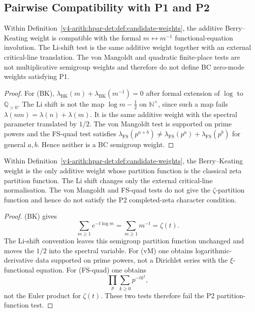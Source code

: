 \subsection{Pairwise Compatibility with P1 and P2}
\label{v4-arith:hpar-det:compat-P1-P2}

\begin{lemma}
\label{v4-arith:hpar-det:lem:P1-compat}
Within
Definition~\ref{v4-arith:hpar-det:def:candidate-weights}, the additive
Berry--Keating weight is compatible with the formal
\(m\leftrightarrow m^{-1}\) functional-equation involution. The
Li-shift test is the same additive weight together with an external
critical-line translation. The von Mangoldt and quadratic finite-place
tests are not multiplicative semigroup weights and therefore do
not define BC zero-mode weights satisfying P1.
\end{lemma}

\begin{proof}
For (BK),
\(\lambda_{\mathrm{BK}}(m)+\lambda_{\mathrm{BK}}(m^{-1})=0\) after
formal extension of \(\log\) to \(\mathbb{Q}_{>0}\). The Li shift is not the map
\(\log m-\frac12\) on \(\mathbb{N}^{\times}\), since such a map fails
\(\lambda(nm)=\lambda(n)+\lambda(m)\). It is the same additive weight
with the spectral parameter translated by \(1/2\). The von Mangoldt
test is supported on prime powers and the FS-quad test satisfies
\(\lambda_{\mathrm{FS}}(p^{a+b})\ne
\lambda_{\mathrm{FS}}(p^{a})+\lambda_{\mathrm{FS}}(p^{b})\) for
general \(a,b\). Hence neither is a BC semigroup weight.
\end{proof}

\begin{lemma}
\label{v4-arith:hpar-det:lem:P2-compat}
Within
Definition~\ref{v4-arith:hpar-det:def:candidate-weights}, the Berry--Keating
weight is the only additive weight whose partition function is the
classical zeta partition function. The Li shift changes only the
external critical-line normalisation. The von Mangoldt and FS-quad
tests do not give the \(\zeta\)-partition function and hence do not
satisfy the P2 completed-zeta character condition.
\end{lemma}

\begin{proof}
(BK) gives
\[
 \sum_{m\geq 1}e^{-t\log m}=\sum_{m\geq 1}m^{-t}=\zeta(t).
\]
The Li-shift convention leaves this semigroup partition function
unchanged and moves the \(1/2\) into the spectral variable. For (vM)
one obtains logarithmic-derivative data supported on prime
powers, not a Dirichlet series with the \(\xi\)-functional equation.
For (FS-quad) one obtains
\[
 \prod_{p}\sum_{k\geq0}p^{-tk^{2}},
\]
not the Euler product for \(\zeta(t)\). These two tests therefore
fail the P2 partition-function test.
\end{proof}

